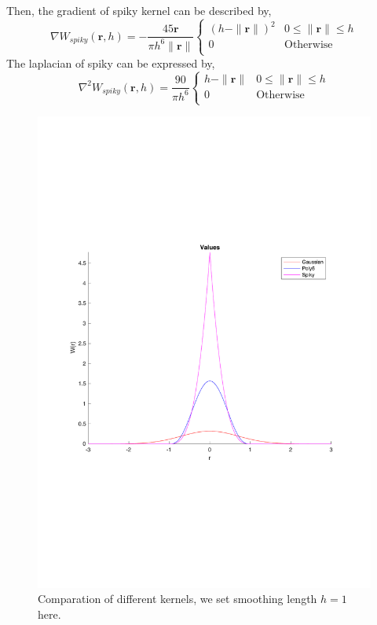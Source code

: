     Then, the gradient of spiky kernel can be described by,
    \begin{equation}
        \nabla W_{spiky}(\textbf{r}, h) = -\frac{45 \textbf{r}}{\pi h^6 \|\textbf{r}\|}
            \begin{cases}
                (h - \|\textbf{r}\|)^2 & 0\le\|\textbf{r}\|\le h \\
                0 & \textrm{Otherwise}\\
            \end{cases}
    \end{equation}
     The laplacian of spiky can be expressed by,
     \begin{equation}
        \nabla^2 W_{spiky}(\textbf{r}, h) = \frac{90}{\pi h^6}
            \begin{cases}
                h - \| \textbf{r} \| & 0 \le \| \textbf{r} \| \le h \\
                0 & \textrm{Otherwise}\\
            \end{cases}
    \end{equation}

    \begin{figure}[!ht]
        \centering
        \includegraphics[scale = 0.5]{Figures/kernels}
        \caption{Comparation of different kernels, we set smoothing length $h = 1$ here.}
    \end{figure}

